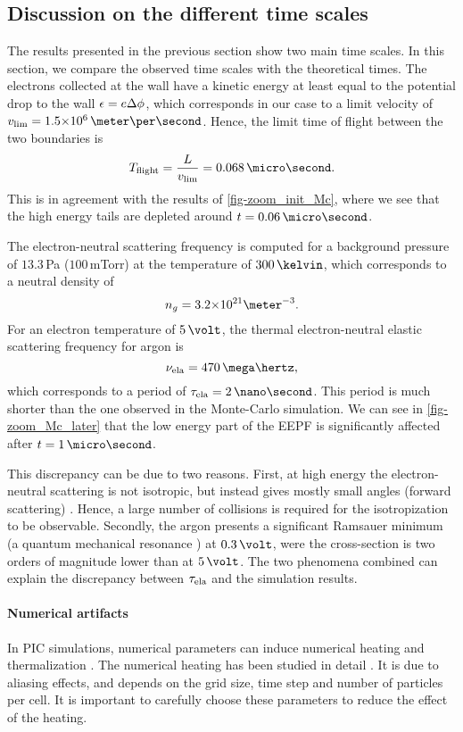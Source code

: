   \subsection{Discussion on the different time scales}
    The results presented in the previous section show two main time scales.
    In this section, we compare the observed time scales with the theoretical times.
    The electrons collected at the wall have a kinetic energy at least equal to the potential drop to the wall $\epsilon = e \Delta \phi$, which corresponds in our case to a limit velocity of $v_{\rm lim} = \sn{1.5}{6} \,\meter\per\second$.
    Hence, the limit time of flight between the two boundaries is
    \[ T_{\rm flight} = \frac{L}{v_{\rm lim}} = 0.068 \,\micro\second.  \]
    This is in agreement with the results of \cref{fig-zoom_init_Mc}, where we see that the high energy tails are depleted around $t=0.06\,\micro\second$.
    
    \vspace{1em}
    The electron-neutral scattering frequency is computed for a background pressure of $13.3$\,Pa (${100}$\,mTorr) at the temperature of $300\,\kelvin$, which corresponds to a neutral density of $${n_g = \sn{3.2}{21} \meter^{-3}}.$$
    For an electron temperature of $5\,\volt$, the thermal electron-neutral elastic scattering frequency for argon is \citep[p.73]{lieberman2005}
    \[ \nu_{\rm ela} = 470 \,\mega\hertz,  \] 
    which corresponds to a period of $\tau_{\rm ela} = 2 \,\nano\second$.
    This period is much shorter than the one observed in the Monte-Carlo simulation.
    We can see in \cref{fig-zoom_Mc_later} that the low energy part of the EEPF is significantly affected after $t=1\,\micro\second$.
    
    This discrepancy can be due to two reasons.
    First, at high energy the electron-neutral scattering is not isotropic, but instead gives mostly small angles (forward scattering) \citep{vahedi1995}.
    Hence, a large number of collisions is required for the isotropization to be observable.
    Secondly, the argon presents a significant Ramsauer minimum (a quantum mechanical resonance \citep{lieberman2005}) at $0.3 \,\volt$, were the cross-section is two orders of magnitude lower than at $5\,\volt$.
    The two phenomena combined can explain the discrepancy between $\tau_{\rm ela}$ and the simulation results.
  
    
        \paragraph{Numerical artifacts \\}
        In PIC simulations, numerical parameters can induce numerical heating and thermalization \citep{lai2014}.
        The numerical heating has been studied in detail \citep{birdsall1991}.
        It is due to aliasing effects, and depends on the grid size, time step and number of particles per cell.
        It is important to carefully choose these parameters to reduce the effect of the heating.

